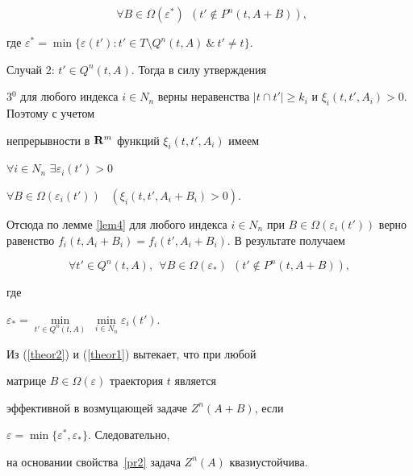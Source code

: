 \begin{pf}
\begin{equation}
\ \ \forall B\in\Omega(\varepsilon^*)\ \ (t' \notin P^n(t, A+B)),


\end{equation}


где $\varepsilon^*=\min\{ \varepsilon(t'): t' \in T\setminus


Q^n(t, A)\ \& \ t'\neq t\}$.





Случай 2: $t' \in Q^n(t, A). $ Тогда в силу утверждения


3$^0$ для любого индекса $i\in N_n$ верны неравенства $|t\cap


t'|\geq k_i$ и $\xi_i(t, t', A_i)>0$. Поэтому с учетом


непрерывности в $\bold{R}^m$ функций $\xi_i(t, t', A_i)$ имеем


$\forall i\in N_n$ \; $\exists \varepsilon_i(t')>0$ \ 


$\forall B \in \Omega(\varepsilon_i(t'))$ \ $(\xi_i(t, t',


A_i+B_i)>0)$.


Отсюда по лемме \ref{lem4} для любого индекса $i\in N_n$ при $B


\in \Omega(\varepsilon_i(t'))$ верно равенство $f_i(t,


A_i+B_i)=f_i(t', A_i+B_i)$. В результате получаем


\begin{equation}\label{theor1}


\forall t' \in Q^n(t, A),\ \ \forall B \in \Omega(\varepsilon_*)


\ \ (t' \notin P^n(t, A+B)),


\end{equation}


где


$\varepsilon_*=\min\limits_{t' \in Q^n(t, A)}\; \min\limits_{i \in


N_n}\varepsilon_i(t')$.





Из (\ref{theor2}) и (\ref{theor1}) вытекает, что при любой


матрице $B\in \Omega(\varepsilon)$ траектория $t$ является


эффективной в возмущающей задаче $Z^n(A+B)$, если


$\varepsilon=\min\{\varepsilon^*,\varepsilon_*\}$. Следовательно,


на основании свойства~\ref{pr2} задача $Z^n(A)$ квазиустойчива.


\end{pf}






